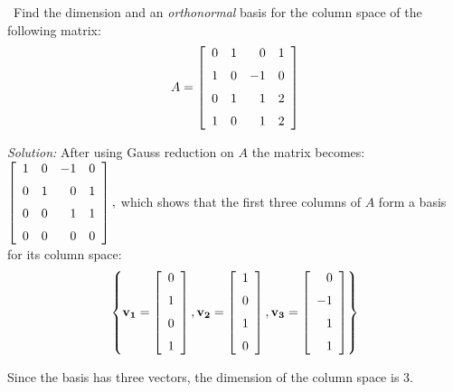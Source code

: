\documentclass[12pt]{article}
\newcommand{\solution}[2]{\ifthenelse{\boolean{showsol}}%
{\vskip10pt\noindent\emph{Solution:}\vskip10pt #2}{\vskip #1}}
\newcounter{question}
\newcommand{\question}{\addtocounter{question}{1}%
                          \pnum{\thequestion}\ }
\newcommand{\pnum}[1]{\noindent {\hskip -18pt \bfseries #1.}}
\begin{document}
\clearpage



\question Find the dimension and an \emph{orthonormal} basis for 
the column space of the following matrix:
\[A =
\left [\begin {array}{rrrr} 0&1&0&1\\\noalign{\medskip}1&0&-1&0
\\\noalign{\medskip}0&1&1&2\\\noalign{\medskip}1&0&1&2\end {array}
\right ]
\]

\solution{3in}{
After using Gauss reduction on $A$ the matrix becomes:
$\displaystyle{
\left [\begin {array}{rrrr} 1&0&-1&0\\\noalign{\medskip}0&1&0&1
\\\noalign{\medskip}0&0&1&1\\\noalign{\medskip}0&0&0&0\end {array}
\right ],
}$
which shows that the first three columns of $A$ form a basis 
for its column space:
\[
\left\{
\mathbf{v_1} = 
\left [\begin {array}{r} 0\\\noalign{\medskip}1\\\noalign{\medskip}0
\\\noalign{\medskip}1\end {array}\right ],
\mathbf{v_2} = 
\left [\begin {array}{r} 1\\\noalign{\medskip}0\\\noalign{\medskip}1
\\\noalign{\medskip}0\end {array}\right ],
\mathbf{v_3} = 
\left [\begin {array}{r} 0\\\noalign{\medskip}-1\\\noalign{\medskip}1
\\\noalign{\medskip}1\end {array}\right ]
\right\}
\]

Since the basis has three vectors, the dimension of the column space
is $3$.

}
\end{document}
